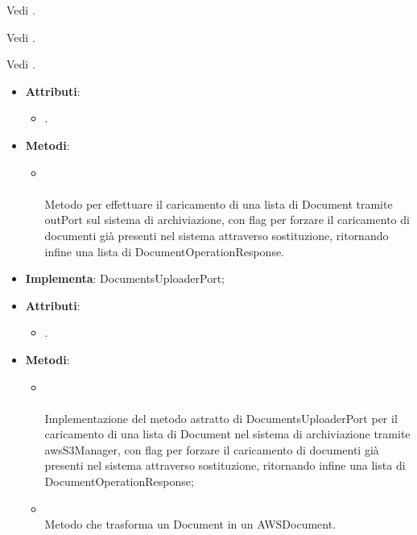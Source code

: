 \documentclass[10pt, a4paper]{article}
\begin{document}
Vedi .

Vedi .

Vedi .

\label{DocumentsUploaderDettaglio}
\begin{itemize}
    \item \textbf{Attributi}:
    \begin{itemize}
        \item {}.
    \end{itemize}
    \item \textbf{Metodi}:
    \begin{itemize}
        \item {}\\ \\ 
        Metodo per effettuare il caricamento di una lista di Document tramite outPort sul sistema di archiviazione, con flag per forzare il caricamento di documenti già presenti nel sistema attraverso sostituzione, ritornando infine una lista di DocumentOperationResponse.
    \end{itemize}
\end{itemize}

\label{DocumentUploaderAWSS3Dettaglio}
\begin{itemize}
    \item \textbf{Implementa}: DocumentsUploaderPort;
    \item \textbf{Attributi}:
    \begin{itemize}
        \item {}.
    \end{itemize}
    \item \textbf{Metodi}:
    \begin{itemize}
        \item {}\\ \\
        Implementazione del metodo astratto di DocumentsUploaderPort per il caricamento di una lista di Document nel sistema di archiviazione tramite awsS3Manager, con flag per  forzare il caricamento di documenti già presenti nel sistema attraverso sostituzione, ritornando infine una lista di DocumentOperationResponse;
        \item {}\\
        Metodo che trasforma un Document in un AWSDocument.
    \end{itemize}
\end{itemize}
\end{document}
